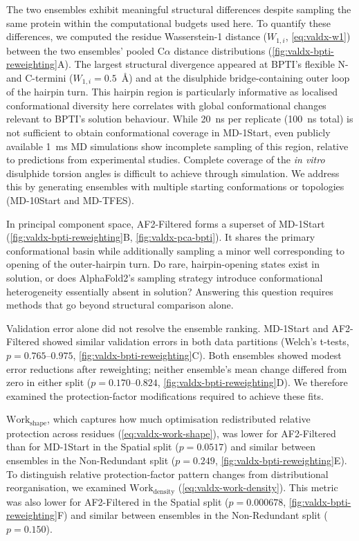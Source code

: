 The two ensembles exhibit meaningful structural differences despite sampling the same protein within the computational budgets used here. To quantify these differences, we computed the residue Wasserstein-1 distance ($W_{1,i}$, \cref{eq:valdx-w1}) between the two ensembles' pooled C$\alpha$ distance distributions (\cref{fig:valdx-bpti-reweighting}A). The largest structural divergence appeared at BPTI's flexible N- and C-termini ($W_{1,i}=0.5$~\AA) and at the disulphide bridge-containing outer loop of the hairpin turn. This hairpin region is particularly informative as localised conformational diversity here correlates with global conformational changes relevant to BPTI's solution behaviour.\supercite{zakharovaFunctionalStructuralRoles2008,qinProteinFoldingGuides2015} While 20~ns per replicate (100~ns total) is not sufficient to obtain conformational coverage in MD-1Start, even publicly available 1~ms MD simulations show incomplete sampling of this region, relative to predictions from experimental studies.\supercite{shawAtomiclevelCharacterizationStructural2010} Complete coverage of the \textit{in vitro} disulphide torsion angles is difficult to achieve through simulation. We address this by generating ensembles with multiple starting conformations or topologies (MD-10Start and MD-TFES).

In principal component space, AF2-Filtered forms a superset of MD-1Start (\cref{fig:valdx-bpti-reweighting}B, \cref{fig:valdx-pca-bpti}). It shares the primary conformational basin while additionally sampling a minor well corresponding to opening of the outer-hairpin turn. Do rare, hairpin-opening states exist in solution, or does AlphaFold2's sampling strategy introduce conformational heterogeneity essentially absent in solution? Answering this question requires methods that go beyond structural comparison alone.

Validation error alone did not resolve the ensemble ranking. MD-1Start and AF2-Filtered showed similar validation errors in both data partitions (Welch's t-tests, $p=0.765$--$0.975$, \cref{fig:valdx-bpti-reweighting}C). Both ensembles showed modest error reductions after reweighting; neither ensemble's mean change differed from zero in either split ($p=0.170$--$0.824$, \cref{fig:valdx-bpti-reweighting}D). We therefore examined the protection-factor modifications required to achieve these fits.

$\text{Work}_\text{shape}$, which captures how much optimisation redistributed relative protection across residues (\cref{eq:valdx-work-shape}), was lower for AF2-Filtered than for MD-1Start in the Spatial split ($p=0.0517$) and similar between ensembles in the Non-Redundant split ($p=0.249$, \cref{fig:valdx-bpti-reweighting}E). To distinguish relative protection-factor pattern changes from distributional reorganisation, we examined $\text{Work}_\text{density}$ (\cref{eq:valdx-work-density}). This metric was also lower for AF2-Filtered in the Spatial split ($p=0.000678$, \cref{fig:valdx-bpti-reweighting}F) and similar between ensembles in the Non-Redundant split ($p=0.150$).

